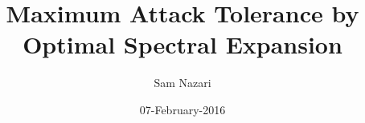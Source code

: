 \documentclass{amsart}
\theoremstyle{definition}
\theoremstyle{remark}
\numberwithin{equation}{section}
\begin{document}
\title{Maximum Attack Tolerance by Optimal Spectral Expansion}

\author{Sam Nazari}
\address{Northeastern University}



\date{07-February-2016}


\end{document}
